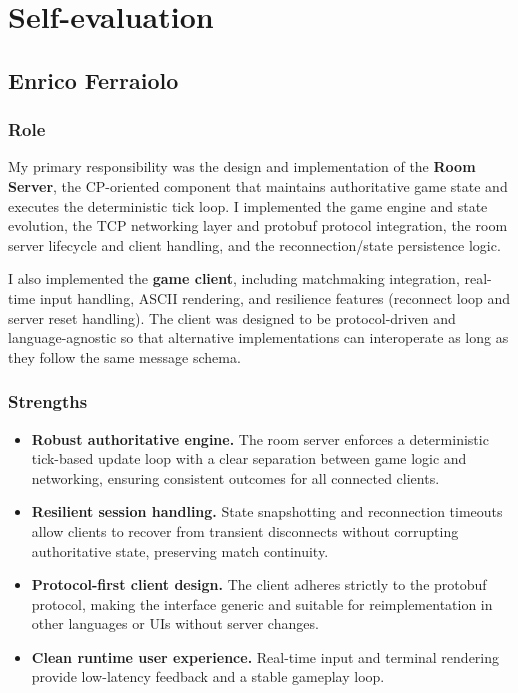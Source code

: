 \section{Self-evaluation}\label{self-evaluation}

\subsection{Enrico Ferraiolo}

\subsubsection{Role}

My primary responsibility was the design and implementation of the \textbf{Room Server}, the CP-oriented component that maintains authoritative game state and executes the deterministic tick loop. I implemented the game engine and state evolution, the TCP networking layer and protobuf protocol integration, the room server lifecycle and client handling, and the reconnection/state persistence logic.

I also implemented the \textbf{game client}, including matchmaking integration, real-time input handling, ASCII rendering, and resilience features (reconnect loop and server reset handling). The client was designed to be protocol-driven and language-agnostic so that alternative implementations can interoperate as long as they follow the same message schema.

\subsubsection{Strengths}

\begin{itemize}
  \item \textbf{Robust authoritative engine.} The room server enforces a deterministic tick-based update loop with a clear separation between game logic and networking, ensuring consistent outcomes for all connected clients.

  \item \textbf{Resilient session handling.} State snapshotting and reconnection timeouts allow clients to recover from transient disconnects without corrupting authoritative state, preserving match continuity.

  \item \textbf{Protocol-first client design.} The client adheres strictly to the protobuf protocol, making the interface generic and suitable for reimplementation in other languages or UIs without server changes.

  \item \textbf{Clean runtime user experience.} Real-time input and terminal rendering provide low-latency feedback and a stable gameplay loop.
\end{itemize}

